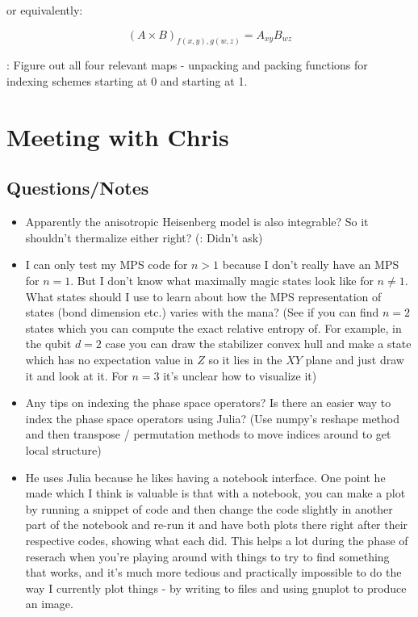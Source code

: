 \documentclass{report}
\begin{document}
 or equivalently:
 
 \begin{equation}(A\times B)_{f(x,y),g(w,z)}=A_{xy}B_{wz}\end{equation}
 
 \todo: Figure out all four relevant maps - unpacking and packing functions for indexing schemes starting at 0 and starting at 1. 
 
 \section{Meeting with Chris}
 
 \subsection{Questions/Notes}
 \begin{itemize}
 \item Apparently the anisotropic Heisenberg model is also integrable? So it shouldn't thermalize either right? (\todo: Didn't ask)
\item I can only test my MPS code for $n>1$ because I don't really have an MPS for $n=1$. But I don't know what maximally magic states look like for $n\neq 1$. What states should I use to learn about how the MPS representation of states (bond dimension etc.) varies with the mana? (See if you can find $n=2$ states which you can compute the exact relative entropy of. For example, in the qubit $d=2$ case you can draw the stabilizer convex hull and make a state which has no expectation value in $Z$ so it lies in the $XY$ plane and just draw it and look at it. For $n=3$ it's unclear how to visualize it)
\item Any tips on indexing the phase space operators? Is there an easier way to index the phase space operators using Julia? (Use numpy's reshape method and then transpose / permutation methods to move indices around to get local structure)
\item He uses Julia because he likes having a notebook interface. One point he made which I think is valuable is that with a notebook, you can make a plot by running a snippet of code and then change the code slightly in another part of the notebook and re-run it and have both plots there right after their respective codes, showing what each did. This helps a lot during the phase of reserach when you're playing around with things to try to find something that works, and it's much more tedious and practically impossible to do the way I currently plot things - by writing to files and using gnuplot to produce an image. 
 \end{itemize}
 
\end{document}
